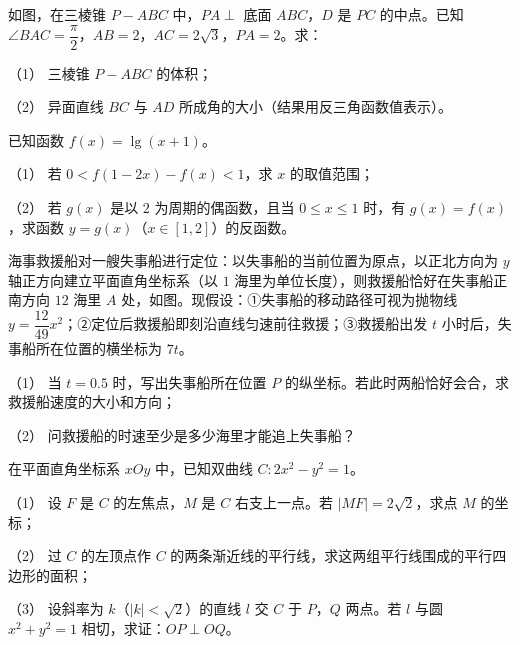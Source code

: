 \Needspace{0.4\textheight}
\begin{question}
如图，在三棱锥 $P-ABC$ 中，$PA\perp$ 底面 $ABC$，$D$ 是 $PC$ 的中点。已知 $\angle BAC=\dfrac\pi2$，$AB=2$，$AC=2\sqrt3$，$PA=2$。求：

（1） 三棱锥 $P-ABC$ 的体积；

（2） 异面直线 $BC$ 与 $AD$ 所成角的大小（结果用反三角函数值表示）。
\nopagebreak[4]
\begin{center}\end{center}
\nopagebreak[4]
\end{question}
\begin{question}
已知函数 $f(x)=\lg(x+1)$。

（1） 若 $0<f(1-2x)-f(x)<1$，求 $x$ 的取值范围；

（2） 若 $g(x)$ 是以 $2$ 为周期的偶函数，且当 $0\leqslant x\leqslant1$ 时，有 $g(x)=f(x)$，求函数 $y=g(x)$（$x\in[1,2]$）的反函数。

\Needspace{0.4\textheight}
\end{question}
\begin{question}
海事救援船对一艘失事船进行定位：以失事船的当前位置为原点，以正北方向为 $y$ 轴正方向建立平面直角坐标系（以 $1$ 海里为单位长度），则救援船恰好在失事船正南方向 $12$ 海里 $A$ 处，如图。现假设：①失事船的移动路径可视为抛物线 $y=\dfrac{12}{49}x^2$；②定位后救援船即刻沿直线匀速前往救援；③救援船出发 $t$ 小时后，失事船所在位置的横坐标为 $7t$。

（1） 当 $t=0.5$ 时，写出失事船所在位置 $P$ 的纵坐标。若此时两船恰好会合，求救援船速度的大小和方向；

（2） 问救援船的时速至少是多少海里才能追上失事船？
\nopagebreak[4]
\begin{center}\end{center}
\nopagebreak[4]
\end{question}
\begin{question}
在平面直角坐标系 $xOy$ 中，已知双曲线 $C:2x^2-y^2=1$。

（1） 设 $F$ 是 $C$ 的左焦点，$M$ 是 $C$ 右支上一点。若 $|MF|=2\sqrt2$，求点 $M$ 的坐标；

（2） 过 $C$ 的左顶点作 $C$ 的两条渐近线的平行线，求这两组平行线围成的平行四边形的面积；

（3） 设斜率为 $k$（$|k|<\sqrt2$）的直线 $l$ 交 $C$ 于 $P$，$Q$ 两点。若 $l$ 与圆 $x^2+y^2=1$ 相切，求证：$OP\perp OQ$。

\end{question}
